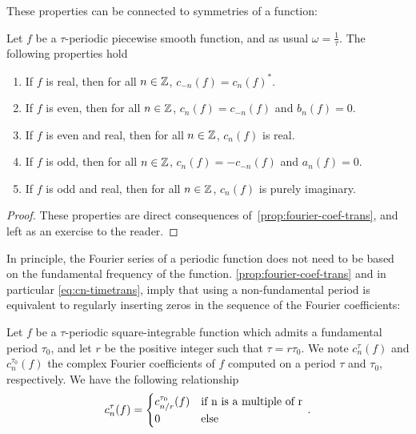 These properties can be connected to symmetries of a function:
\begin{proposition}
	Let $f$ be a $\tau$-periodic piecewise smooth function, and as usual
	$\omega=\frac{1}{\tau}$. The following properties hold
	\begin{enumerate}
		\item If $f$ is real, then for all $n\in\mathbb{Z}$, $c_{-n}(f)=c_{n}(f)^*$.
		\item If $f$ is even, then for all $n\in\mathbb{Z}$, $c_{n}(f)=c_{-n}(f)$ and $b_n(f)=0$.
		\item If $f$ is even and real, then for all $n\in\mathbb{Z}$, $c_n(f)$ is real.
		\item If $f$ is odd, then for all $n\in\mathbb{Z}$, $c_{n}(f)=-c_{-n}(f)$ and $a_n(f)=0$.
		\item If $f$ is odd and real, then for all $n\in\mathbb{Z}$, $c_n(f)$ is purely imaginary.
	\end{enumerate}
\end{proposition}
\begin{proof}
	These properties are direct consequences of~\cref{prop:fourier-coef-trans}, and left as
	an exercise to the reader.
\end{proof}
In principle, the Fourier series of a periodic function does not need to be based on the
fundamental frequency of the function. \cref{prop:fourier-coef-trans} and in particular
\cref{eq:cn-timetrans}, imply that using a non-fundamental period is equivalent to
regularly inserting zeros in the sequence of the Fourier coefficients:
\begin{proposition}
	Let $f$ be a $\tau$-periodic square-integrable function which admits a fundamental
	period $\tau_0$, and let $r$ be the positive integer such that $\tau=r\tau_0$. We note
	$c_n^\tau(f)$ and $c_n^{\tau_0}(f)$ the complex Fourier coefficients of $f$ computed on
	a period $\tau$ and $\tau_0$, respectively. We have the following relationship
	\begin{equation}
		c_n^\tau(f)=
		\begin{cases}
			c_{n/r}^{\tau_0}(f) & \text{if}~$n$~\text{is a multiple of}~$r$ \\
			0                   & \text{else}
		\end{cases}\,.
	\end{equation}
\end{proposition}
